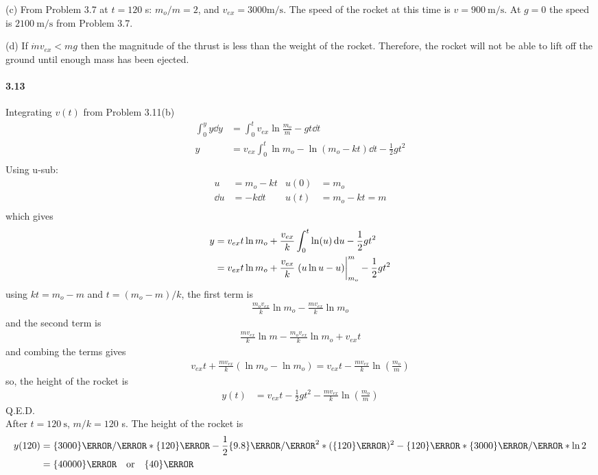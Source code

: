 \documentclass[../problems.tex]{subfiles}
\begin{document}
(c) From Problem 3.7 at $t=120$ s: $m_o/m = 2$, and $v_{ex} = 3000 \si{\m/\s}$. The speed of the
rocket at this time is $v = \qty{900}{\meter/\second}$. At $g = 0$ the speed is 
$\qty{2100}{\meter/\second}$ from Problem 3.7. 

(d) If $\dot{m}v_{ex} < mg$ then the magnitude of the thrust is less than the weight of the rocket. 
Therefore, the rocket will not be able to lift off the ground until enough mass has been ejected.

\paragraph{3.13}
Integrating $v(t)$ from Problem 3.11(b)
\begin{align*}
    \int_{0}^{y} y \dd{y} &= \int_{0}^{t} v_{ex} \ln{\frac{m_o}{m}} - gt \dd{t} \\
    y &= v_{ex} \int_{0}^{t} \ln{m_o} - \ln(m_o-kt) \dd{t} - \frac{1}{2}gt^2 \\
\end{align*}
Using u-sub:
\begin{align*}
    u &= m_o - kt       & u(0) &= m_o\\
    \dd{u} &= -k \dd{t} & u(t) &= m_o - kt = m \\
\end{align*}
which gives
\begin{align*}
    y &= v_{ex}t \ln{m_o} + \frac{v_{ex}}{k} \int_{0}^{t} \ln(u) \dd{u} - \frac{1}{2}gt^2 \\
    &= v_{ex}t \ln{m_o} + \frac{v_{ex}}{k} \eval{\quantity(u\ln{u} - u)}_{m_o}^{m}- \frac{1}{2}gt^2
\end{align*}
using $kt = m_o - m$ and $t = (m_o - m)/k$, the first term is
\begin{align*}
    \frac{m_o v_{ex}}{k} \ln{m_o} - \frac{m v_{ex}}{k} \ln{m_o} 
\end{align*}
and the second term is
\begin{align*}
    \frac{m v_{ex}}{k} \ln{m} - \frac{m_o v_{ex}}{k} \ln{m_o} + v_{ex}t
\end{align*}
and combing the terms gives
\begin{align*}
    v_{ex}t + \frac{m v_{ex}}{k} (\ln{m_o} - \ln{m_o})
        = v_{ex}t - \frac{m v_{ex}}{k} \ln(\frac{m_o}{m})
\end{align*}
so, the height of the rocket is
\begin{align*}
    y(t) &= v_{ex}t - \frac{1}{2}gt^2 - \frac{m v_{ex}}{k} \ln(\frac{m_o}{m})
\end{align*}
Q.E.D. \\
After $t = \qty{120}{\second}$, $m/k = 120$ s. The height of the rocket is
\begin{align*}
    y(120) &= \qty{3000}{\m/\s} * \qty{120}{\s}
        - \frac{1}{2} \qty{9.8}{\m/\s^2} * (\qty{120}{\s})^2
        - \qty{120}{\s} * \qty{3000}{\m/\s}
        * \ln{2} \\
    &= \qty{40000}{\m} \qor \qty{40}{\km}
\end{align*}
\end{document}
